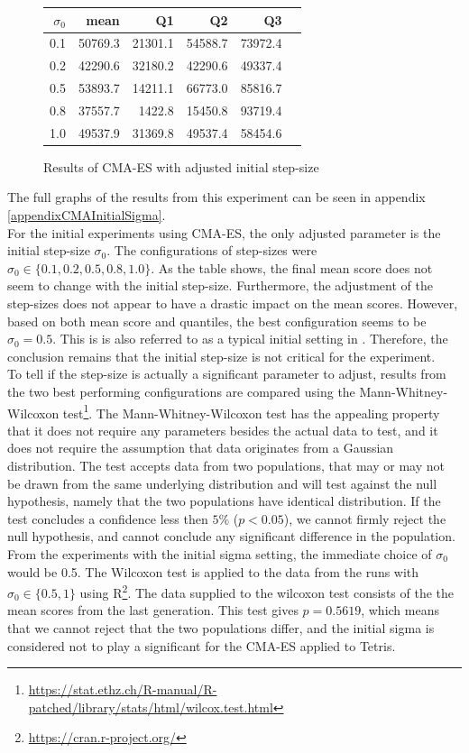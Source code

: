 \begin{figure}[H]
\centering
\begin{tabular}{r | r r r r r}
$\sigma_0$ & mean & Q1 & Q2 & Q3\\
\hline
0.1 & 50769.3 & 21301.1 & 54588.7 & 73972.4\\
0.2 & 42290.6 & 32180.2 & 42290.6 & 49337.4\\
0.5 & 53893.7 & 14211.1 & 66773.0 & 85816.7\\
0.8 & 37557.7 & 1422.8  & 15450.8 & 93719.4\\
1.0 & 49537.9 & 31369.8 & 49537.4 & 58454.6
\end{tabular}
\caption{Results of CMA-ES with adjusted initial step-size \label{CMAInitialSigmaConfigTest}}
\end{figure}
The full graphs of the results from this experiment can be seen in 
appendix \ref{appendixCMAInitialSigma}.\\
For the initial experiments using CMA-ES, 
the only adjusted parameter is the initial 
step-size $\sigma_0$. The configurations of step-sizes were 
$\sigma_0 \in \{0.1, 0.2, 0.5, 0.8, 1.0\}$. As the table shows,
the final mean score does not seem to change with the initial step-size.
Furthermore, the adjustment of the step-sizes does not appear to 
have a drastic impact on the mean scores. However, based on both mean score and
quantiles, the best configuration seems to be $\sigma_0 = 0.5$. This is 
is also referred to as a typical initial setting in \citep{boumaza2009}.
Therefore, the conclusion remains that the initial step-size is not critical 
for the experiment.\\

To tell if the step-size is actually a significant parameter to adjust, results from 
the two best performing configurations are compared using the Mann-Whitney-Wilcoxon test\footnote{\url{https://stat.ethz.ch/R-manual/R-patched/library/stats/html/wilcox.test.html}}.
The Mann-Whitney-Wilcoxon test has the appealing property that it does not require any parameters
besides the actual data to test, and it does not require the assumption that data originates 
from a Gaussian distribution. The test accepts data from two populations, that may or may not 
be drawn from the same underlying distribution and will test against the null hypothesis, 
namely that the two populations have identical distribution. If the test concludes a 
confidence less then $5\%$ ($p < 0.05$), we cannot firmly reject the null hypothesis, 
and cannot conclude any significant difference in the population. From the experiments
with the initial sigma setting, the immediate choice of $\sigma_0$ would be 0.5.
The Wilcoxon test is applied to the data from the runs with $\sigma_0 \in \{0.5, 1\}$
using R\footnote{\url{https://cran.r-project.org/}}. The data supplied
to the wilcoxon test consists of the the mean scores from the last generation.
This test gives $p=0.5619$, which means that we cannot reject that the two 
populations differ, and the initial sigma is considered not to play a significant 
for the CMA-ES applied to Tetris.

